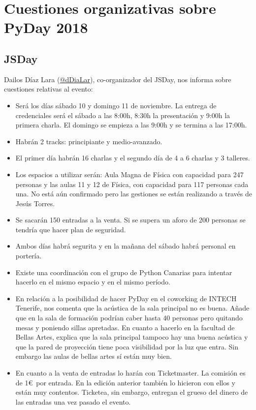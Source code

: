 \documentclass[a4paper, 12pt]{article}
\begin{document}
\section{Cuestiones organizativas sobre PyDay 2018}

\subsection*{JSDay}

Dailos Díaz Lara (\href{https://twitter.com/ddialar}{@dDiaLar}), co-organizador del JSDay, nos informa sobre cuestiones relativas al evento:

\begin{itemize}
    \item Será los días sábado 10 y domingo 11 de noviembre. La entrega de credenciales será el sábado a las 8:00h, 8:30h la presentación y 9:00h la primera charla. El domingo se empieza a las 9:00h y se termina a las 17:00h.
    \item Habrán 2 tracks: principiante y medio-avanzado.
    \item El primer día habrán 16 charlas y el segundo día de 4 a 6 charlas y 3 talleres.
    \item Los espacios a utilizar serán: Aula Magna de Física con capacidad para 247 personas y las aulas 11 y 12 de Física, con capacidad para 117 personas cada una. No está aún confirmado pero las gestiones se están realizando a través de Jesús Torres.
    \item Se sacarán 150 entradas a la venta. Si se supera un aforo de 200 personas se tendría que hacer plan de seguridad.
    \item Ambos días habrá segurita y en la mañana del sábado habrá personal en portería.
    \item Existe una coordinación con el grupo de Python Canarias para intentar hacerlo en el mismo espacio y en el mismo período.
    \item En relación a la posibilidad de hacer PyDay en el coworking de INTECH Tenerife, nos comenta que la acústica de la sala principal no es buena. Añade que en la sala de formación podrían caber hasta 40 personas pero quitando mesas y poniendo sillas apretadas. En cuanto a hacerlo en la facultad de Bellas Artes, explica que la sala principal tampoco hay una buena acústica y que la pared de proyección tiene poca visibilidad por la luz que entra. Sin embargo las aulas de bellas artes sí están muy bien.
    \item En cuanto a la venta de entradas lo harán con Ticketmaster. La comisión es de 1\euro\ por entrada. En la edición anterior también lo hicieron con ellos y están muy contentos. Ticketea, sin embargo, entregan el grueso del dinero de las entradas una vez pasado el evento.

\end{itemize}
\end{document}
